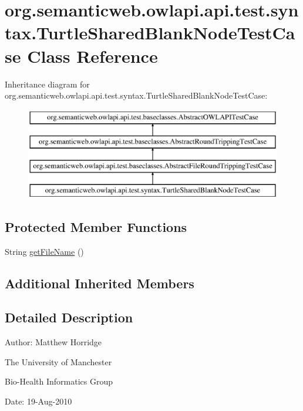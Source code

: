 \hypertarget{classorg_1_1semanticweb_1_1owlapi_1_1api_1_1test_1_1syntax_1_1_turtle_shared_blank_node_test_case}{\section{org.\-semanticweb.\-owlapi.\-api.\-test.\-syntax.\-Turtle\-Shared\-Blank\-Node\-Test\-Case Class Reference}
\label{classorg_1_1semanticweb_1_1owlapi_1_1api_1_1test_1_1syntax_1_1_turtle_shared_blank_node_test_case}
}
Inheritance diagram for org.\-semanticweb.\-owlapi.\-api.\-test.\-syntax.\-Turtle\-Shared\-Blank\-Node\-Test\-Case\-:\begin{figure}[H]
\begin{center}
\leavevmode
\includegraphics[height=4.000000cm]{classorg_1_1semanticweb_1_1owlapi_1_1api_1_1test_1_1syntax_1_1_turtle_shared_blank_node_test_case}
\end{center}
\end{figure}
\subsection*{Protected Member Functions}
\begin{DoxyCompactItemize}
\item 
String \hyperlink{classorg_1_1semanticweb_1_1owlapi_1_1api_1_1test_1_1syntax_1_1_turtle_shared_blank_node_test_case_aa27ed4ea09a1e09c033b0f72cae1c8ea}{get\-File\-Name} ()
\end{DoxyCompactItemize}
\subsection*{Additional Inherited Members}


\subsection{Detailed Description}
Author\-: Matthew Horridge\par
 The University of Manchester\par
 Bio-\/\-Health Informatics Group\par
 Date\-: 19-\/\-Aug-\/2010 

